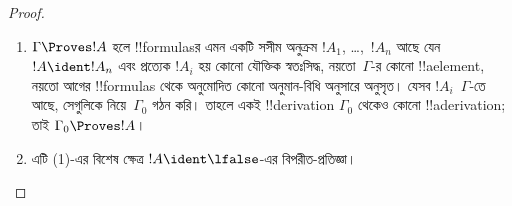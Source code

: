 \documentclass[../../../include/open-logic-section]{subfiles}
\begin{document}
\begin{proof}
  \begin{enumerate}
    \item $\Gamma \Proves !A$ হলে !!{formula}sর এমন একটি সসীম
      অনুক্রম $!A_1$, \dots,~$!A_n$ আছে যেন $!A \ident !A_n$ এবং
      প্রত্যেক $!A_i$ হয় কোনো যৌক্তিক স্বতঃসিদ্ধ, নয়তো~$\Gamma$-র
      কোনো !!a{element}, নয়তো আগের !!{formula}s থেকে অনুমোদিত কোনো
      অনুমান-বিধি অনুসারে অনুসৃত। যেসব $!A_i$~$\Gamma$-তে আছে,
      সেগুলিকে নিয়ে~$\Gamma_0$ গঠন করি। তাহলে একই !!{derivation}
      $\Gamma_0$ থেকেও কোনো !!a{derivation}; তাই $\Gamma_0 \Proves !A$।
    \item এটি (1)-এর বিশেষ ক্ষেত্র $!A \ident \lfalse$-এর
      বিপরীত-প্রতিজ্ঞা।
\end{enumerate}
\end{proof}
\end{document}
